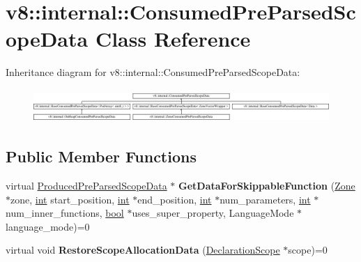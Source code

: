 \hypertarget{classv8_1_1internal_1_1ConsumedPreParsedScopeData}{}\section{v8\+:\+:internal\+:\+:Consumed\+Pre\+Parsed\+Scope\+Data Class Reference}
\label{classv8_1_1internal_1_1ConsumedPreParsedScopeData}
Inheritance diagram for v8\+:\+:internal\+:\+:Consumed\+Pre\+Parsed\+Scope\+Data\+:\begin{figure}[H]
\begin{center}
\leavevmode
\includegraphics[height=1.278539cm]{classv8_1_1internal_1_1ConsumedPreParsedScopeData}
\end{center}
\end{figure}
\subsection*{Public Member Functions}
\begin{DoxyCompactItemize}
\item 
\mbox{\label{classv8_1_1internal_1_1ConsumedPreParsedScopeData_aeed88a64fb919f091f95f2e0fb59ab08}} 
virtual \mbox{\hyperlink{classv8_1_1internal_1_1ProducedPreParsedScopeData}{Produced\+Pre\+Parsed\+Scope\+Data}} $\ast$ {\bfseries Get\+Data\+For\+Skippable\+Function} (\mbox{\hyperlink{classv8_1_1internal_1_1Zone}{Zone}} $\ast$zone, \mbox{\hyperlink{classint}{int}} start\+\_\+position, \mbox{\hyperlink{classint}{int}} $\ast$end\+\_\+position, \mbox{\hyperlink{classint}{int}} $\ast$num\+\_\+parameters, \mbox{\hyperlink{classint}{int}} $\ast$num\+\_\+inner\+\_\+functions, \mbox{\hyperlink{classbool}{bool}} $\ast$uses\+\_\+super\+\_\+property, Language\+Mode $\ast$language\+\_\+mode)=0
\item 
\mbox{\label{classv8_1_1internal_1_1ConsumedPreParsedScopeData_aa7d554f079d10ec8ebc769ad3789cbfb}} 
virtual void {\bfseries Restore\+Scope\+Allocation\+Data} (\mbox{\hyperlink{classv8_1_1internal_1_1DeclarationScope}{Declaration\+Scope}} $\ast$scope)=0
\end{DoxyCompactItemize}

